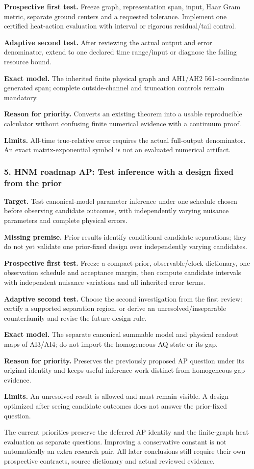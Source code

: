 \textbf{Prospective first test.} Freeze graph, representation span, input, Haar Gram metric, separate ground centers and a requested tolerance. Implement one certified heat-action evaluation with interval or rigorous residual/tail control.

\textbf{Adaptive second test.} After reviewing the actual output and error denominator, extend to one declared time range/input or diagnose the failing resource bound.

\textbf{Exact model.} The inherited finite physical graph and AH1/AH2 561-coordinate generated span; complete outside-channel and truncation controls remain mandatory.

\textbf{Reason for priority.} Converts an existing theorem into a usable reproducible calculator without confusing finite numerical evidence with a continuum proof.

\textbf{Limits.} All-time true-relative error requires the actual full-output denominator. An exact matrix-exponential symbol is not an evaluated numerical artifact.

\subsubsection{5. HNM roadmap AP: Test inference with a design fixed from the prior}
\textbf{Target.} Test canonical-model parameter inference under one schedule chosen before observing candidate outcomes, with independently varying nuisance parameters and complete physical errors.

\textbf{Missing premise.} Prior results identify conditional candidate separations; they do not yet validate one prior-fixed design over independently varying candidates.

\textbf{Prospective first test.} Freeze a compact prior, observable/clock dictionary, one observation schedule and acceptance margin, then compute candidate intervals with independent nuisance variations and all inherited error terms.

\textbf{Adaptive second test.} Choose the second investigation from the first review: certify a supported separation region, or derive an unresolved/inseparable counterfamily and revise the future design rule.

\textbf{Exact model.} The separate canonical summable model and physical readout maps of AI3/AI4; do not import the homogeneous AQ state or its gap.

\textbf{Reason for priority.} Preserves the previously proposed AP question under its original identity and keeps useful inference work distinct from homogeneous-gap evidence.

\textbf{Limits.} An unresolved result is allowed and must remain visible. A design optimized after seeing candidate outcomes does not answer the prior-fixed question.

The current priorities preserve the deferred AP identity and the finite-graph heat evaluation as separate questions. Improving a conservative constant is not automatically an extra research pair. All later conclusions still require their own prospective contracts, source dictionary and actual reviewed evidence.
